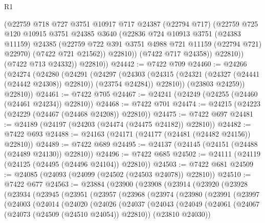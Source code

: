 \begin{lexlean}{R1}
\begin{coremodule}
                (@22759
                  @718
                  @727
                  @3751
                  @10917
                  @717
                  @24387
                  (@22794 @717)
                  (@22759
                    @725
                    @120
                    @10915
                    @3751
                    @24385
                    @3640
                    (@22836
                      @724
                      @10913
                      @3751
                      (@24383 @11159)
                      @24385
                      (@22759 @722 @391 @3751 @4988 @721 @11159 (@22794 @721) @22970)
                      (@7422 @721 @21562))
                    @22810))
                (@7422 @717 @24358))
              @22810))
          (@7422 @713 @24332))
        @22810))
@24442 := @7422 @709
@24460 := @24266
    (@24274
      (@24280
        (@24291
          (@24297
            (@24303
              (@24315 (@24321 (@24327 (@24441 (@24442 @24308)) @22810)) (@23754 @24284))
              @22810))
          (@23803 @24259))
        @22810))
@24461 := @7422 @705
@24467 := @24241 (@24249 (@24255 (@24460 (@24461 @24234)) @22810))
@24468 := @7422 @701
@24474 := @24215 (@24223 (@24229 (@24467 (@24468 @24208)) @22810))
@24475 := @7422 @697
@24481 := @24189 (@24197 (@24203 (@24474 (@24475 @24182)) @22810))
@24482 := @7422 @693
@24488 := @24163 (@24171 (@24177 (@24481 (@24482 @24156)) @22810))
@24489 := @7422 @689
@24495 := @24137 (@24145 (@24151 (@24488 (@24489 @24130)) @22810))
@24496 := @7422 @685
@24502 := @24111 (@24119 (@24125 (@24495 (@24496 @24104)) @22810))
@24503 := @7422 @681
@24509 := @24085 (@24093 (@24099 (@24502 (@24503 @24078)) @22810))
@24510 := @7422 @677
@24563 := @23884
    (@23900
      (@23908
        (@23914
          (@23920
            (@23928
              (@23934
                (@23945
                  (@23951
                    (@23957
                      (@23968
                        (@23974
                          (@23980
                            (@23991
                              (@23997
                                (@24003
                                  (@24014
                                    (@24020
                                      (@24026
                                        (@24037
                                          (@24043
                                            (@24049
                                              (@24061
                                                (@24067 (@24073 (@24509 (@24510 @24054)) @22810))
                                                (@23810 @24030))

\end{coremodule}
\end{lexlean}
